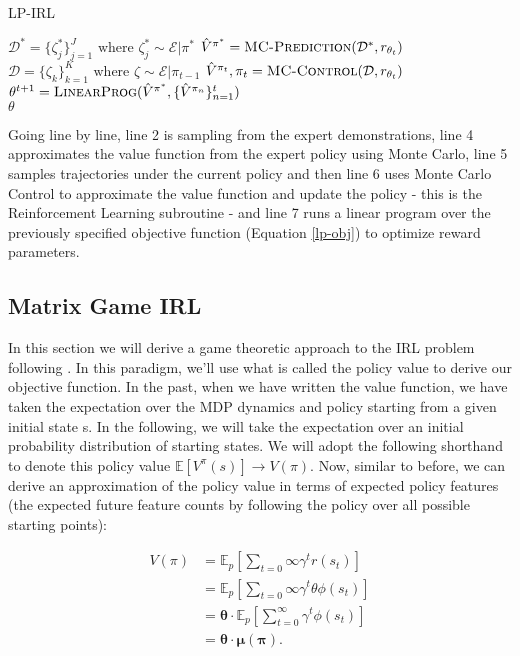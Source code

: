 \documentclass[11pt]{article}
\begin{document}
\begin{algorithm}[H]
    \label{algo:lp_irl}
    \caption{LP-IRL}
    \begin{algorithmic}[1]
    \State $\mathcal{D^*} = \{\zeta_j^*\}_{j=1}^J \textrm{ where } \zeta_j^* \sim \mathcal{E}|\pi^*$
    \State $\hat{V}^{\pi^*} = \Call{MC-Prediction}{\mathcal{D^*}, r_{\theta_t}}$
    \State $\mathcal{D} = \{\zeta_k\}_{k=1}^K \textrm{ where } \zeta \sim \mathcal{E}|\pi_{t-1}$
    \State $\hat{V}^{\pi_t},\pi_t = \Call{MC-Control}{\mathcal{D}, r_{\theta_t}}$
    \State $\theta^{t+1} = \Call{LinearProg}{\hat{V}^{\pi^*}, \{\hat{V}^{\pi_n}\}_{n=1}^t}$
    \EndFor \\
    \Return $\theta$
    \EndFunction
    \end{algorithmic}
\end{algorithm}

Going line by line, line 2 is sampling from the expert demonstrations, line 4 approximates the value function from the expert policy using Monte Carlo, line 5 samples trajectories under the current policy and then line 6 uses Monte Carlo Control to approximate the value function and update the policy - this is the Reinforcement Learning subroutine - and line 7 runs a linear program over the previously specified objective function (Equation \ref{lp-obj}) to optimize reward parameters.


\subsection{Matrix Game IRL}
In this section we will derive a game theoretic approach to the IRL problem following \cite{MGIRL}. In this paradigm, we'll use what is called the policy value to derive our objective function. In the past, when we have written the value function, we have taken the expectation over the MDP dynamics and policy starting from a given initial state s. In the following, we will take the expectation over an initial probability distribution of starting states. We will adopt the following shorthand to denote this policy value $\mathbb{E}[V^{\pi}(s)] \rightarrow V(\pi)$. Now, similar to before, we can derive an approximation of the policy value in terms of expected policy features (the expected future feature counts by following the policy over all possible starting points):

\begin{equation}
\begin{split}
    V(\pi) & =  \mathbb{E}_p[\sum_{t=0}{\infty} \gamma^t r(s_t)] \\
    & = \mathbb{E}_p[\sum_{t=0}{\infty} \gamma^t \theta \phi(s_t)] \\
    & = \boldsymbol{\theta} \cdot \mathbb{E}_p[\sum_{t=0}^{\infty} \gamma^t \phi(s_t)] \\
    & = \boldsymbol{\theta} \cdot \boldsymbol{\mu(\pi)}.
\end{split}
\end{equation}
\end{document}
